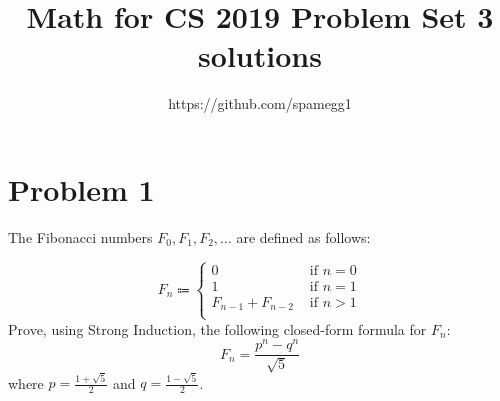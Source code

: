 \documentclass[14pt]{extarticle}
\title{Math for CS 2019 Problem Set 3 solutions}
\author{https://github.com/spamegg1}
\begin{document}
\maketitle
\tableofcontents

\section{Problem 1}
The Fibonacci numbers $F_0, F_1, F_2, \ldots$ are defined as follows:

\begin{displaymath}
   F_n \Coloneqq \left\{
     \begin{array}{lr}
       0 & \text{ if } n = 0\\
       1 & \text{ if } n = 1\\
       F_{n-1} + F_{n-2} & \text{ if } n > 1\\
     \end{array}
   \right.
\end{displaymath} 
Prove, using Strong Induction, the following closed-form formula for $F_n$:
$$
F_n = \frac{p^n - q^n}{\sqrt{5}}
$$
where $p = \frac{1 + \sqrt{5}}{2}$ and $q = \frac{1 - \sqrt{5}}{2}$.
\end{document}
